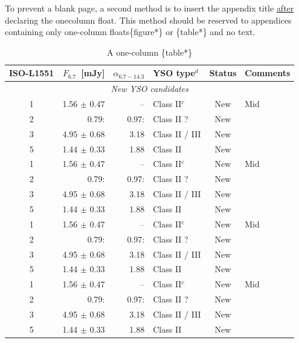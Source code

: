 \documentclass{aa}
\begin{document}
\begin{appendix}
\begin{table}[ht!]
To prevent a blank page, a second method is to insert
the appendix title \underline{after} declaring the onecolumn float.
\newline This method should be reserved to appendices
containing only one-column floats\{figure*\} or \{table*\}
and no text.

\caption {A one-column \{table*\} \newline}
\label{table:2} 
\centering
\begin{tabular}{crrlcl}
\hline\hline             
ISO-L1551 & $F_{6.7}$~[mJy] & $\alpha_{6.7-14.3}$
& YSO type$^{d}$ & Status & Comments\\
\hline
  \multicolumn{6}{c}{\it New YSO candidates}\\ %
\hline
  1 & 1.56 $\pm$ 0.47 & --    & Class II$^{c}$ & New & Mid\\
  2 & 0.79:           & 0.97: & Class II ?     & New & \\
  3 & 4.95 $\pm$ 0.68 & 3.18  & Class II / III & New & \\
  5 & 1.44 $\pm$ 0.33 & 1.88  & Class II       & New & \\
  1 & 1.56 $\pm$ 0.47 & --    & Class II$^{c}$ & New & Mid\\
  2 & 0.79:           & 0.97: & Class II ?     & New & \\
  3 & 4.95 $\pm$ 0.68 & 3.18  & Class II / III & New & \\
  5 & 1.44 $\pm$ 0.33 & 1.88  & Class II       & New & \\
  1 & 1.56 $\pm$ 0.47 & --    & Class II$^{c}$ & New & Mid\\
  2 & 0.79:           & 0.97: & Class II ?     & New & \\
  3 & 4.95 $\pm$ 0.68 & 3.18  & Class II / III & New & \\
  5 & 1.44 $\pm$ 0.33 & 1.88  & Class II       & New & \\
  1 & 1.56 $\pm$ 0.47 & --    & Class II$^{c}$ & New & Mid\\
  2 & 0.79:           & 0.97: & Class II ?     & New & \\
  3 & 4.95 $\pm$ 0.68 & 3.18  & Class II / III & New & \\
  5 & 1.44 $\pm$ 0.33 & 1.88  & Class II       & New & \\


\end{tabular}
\end{table}
\end{appendix}
\end{document}
